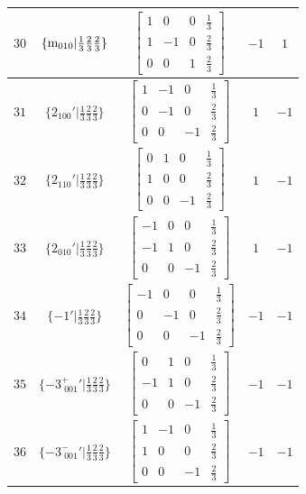 \documentclass[fleqn,8pt]{jsarticle}
\begin{document}
\begin{longtable}{ccccc}
$ 30 $ & $ \{{\rm m}_{010}|\frac{1}{3} \frac{2}{3} \frac{2}{3}\} $ & $ \begin{bmatrix} 1 & 0 & 0 & \frac{1}{3} \\ 1 & -1 & 0 & \frac{2}{3} \\ 0 & 0 & 1 & \frac{2}{3} \end{bmatrix} $ & $ -1 $ & $ 1 $ \\ \hline
$ 31 $ & $ \{2{}_{100}{}'|\frac{1}{3} \frac{2}{3} \frac{2}{3}\} $ & $ \begin{bmatrix} 1 & -1 & 0 & \frac{1}{3} \\ 0 & -1 & 0 & \frac{2}{3} \\ 0 & 0 & -1 & \frac{2}{3} \end{bmatrix} $ & $ 1 $ & $ -1 $ \\ \hline
$ 32 $ & $ \{2{}_{110}{}'|\frac{1}{3} \frac{2}{3} \frac{2}{3}\} $ & $ \begin{bmatrix} 0 & 1 & 0 & \frac{1}{3} \\ 1 & 0 & 0 & \frac{2}{3} \\ 0 & 0 & -1 & \frac{2}{3} \end{bmatrix} $ & $ 1 $ & $ -1 $ \\ \hline
$ 33 $ & $ \{2{}_{010}{}'|\frac{1}{3} \frac{2}{3} \frac{2}{3}\} $ & $ \begin{bmatrix} -1 & 0 & 0 & \frac{1}{3} \\ -1 & 1 & 0 & \frac{2}{3} \\ 0 & 0 & -1 & \frac{2}{3} \end{bmatrix} $ & $ 1 $ & $ -1 $ \\ \hline
$ 34 $ & $ \{-1{}'|\frac{1}{3} \frac{2}{3} \frac{2}{3}\} $ & $ \begin{bmatrix} -1 & 0 & 0 & \frac{1}{3} \\ 0 & -1 & 0 & \frac{2}{3} \\ 0 & 0 & -1 & \frac{2}{3} \end{bmatrix} $ & $ -1 $ & $ -1 $ \\ \hline
$ 35 $ & $ \{-3^{+}_{\,\,001}{}'|\frac{1}{3} \frac{2}{3} \frac{2}{3}\} $ & $ \begin{bmatrix} 0 & 1 & 0 & \frac{1}{3} \\ -1 & 1 & 0 & \frac{2}{3} \\ 0 & 0 & -1 & \frac{2}{3} \end{bmatrix} $ & $ -1 $ & $ -1 $ \\ \hline
$ 36 $ & $ \{-3^{-}_{\,\,001}{}'|\frac{1}{3} \frac{2}{3} \frac{2}{3}\} $ & $ \begin{bmatrix} 1 & -1 & 0 & \frac{1}{3} \\ 1 & 0 & 0 & \frac{2}{3} \\ 0 & 0 & -1 & \frac{2}{3} \end{bmatrix} $ & $ -1 $ & $ -1 $ \\
\end{longtable}
\end{document}
